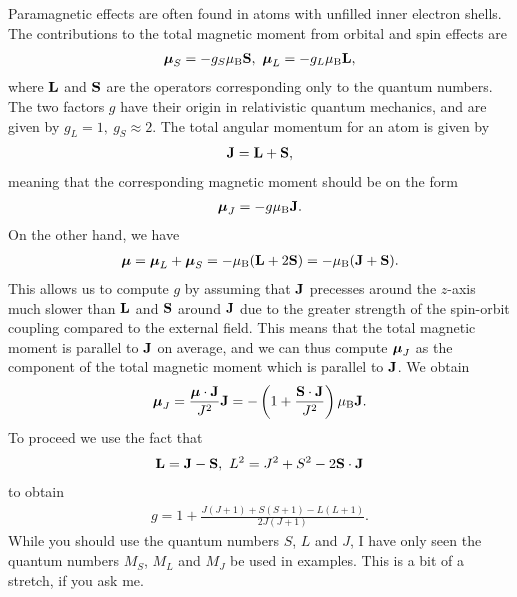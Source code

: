 Paramagnetic effects are often found in atoms with unfilled inner electron shells. The contributions to the total magnetic moment from orbital and spin effects are
\begin{align*}
	\vb*{\mu}_{S} = -g_{S}\mu_{\text{B}}\vb{S},\ \vb*{\mu}_{L} = -g_{L}\mu_{\text{B}}\vb{L},
\end{align*}
where $\vb{L}$ and $\vb{S}$ are the operators corresponding only to the quantum numbers. The two factors $g$ have their origin in relativistic quantum mechanics, and are given by $g_{L} = 1,\ g_{S} \approx 2$. The total angular momentum for an atom is given by
\begin{align*}
	\vb{J} = \vb{L} + \vb{S},
\end{align*}
meaning that the corresponding magnetic moment should be on the form
\begin{align*}
	\vb*{\mu}_{J} = -g\mu_{\text{B}}\vb{J}.
\end{align*}
On the other hand, we have
\begin{align*}
	\vb*{\mu} = \vb*{\mu}_{L} + \vb*{\mu}_{S} = -\mu_{\text{B}}(\vb{L} + 2\vb{S}) = -\mu_{\text{B}}(\vb{J} + \vb{S}).
\end{align*}
This allows us to compute $g$ by assuming that $\vb{J}$ precesses around the $z$-axis much slower than $\vb{L}$ and $\vb{S}$ around $\vb{J}$ due to the greater strength of the spin-orbit coupling compared to the external field. This means that the total magnetic moment is parallel to $\vb{J}$ on average, and we can thus compute $\vb*{\mu}_{J}$ as the component of the total magnetic moment which is parallel to $\vb{J}$. We obtain
\begin{align*}
	\vb*{\mu}_{J} = \frac{\vb*{\mu}\cdot\vb{J}}{J^{2}}\vb{J} = -\left(1 + \frac{\vb{S}\cdot\vb{J}}{J^{2}}\right)\mu_{\text{B}}\vb{J}.
\end{align*}
To proceed we use the fact that
\begin{align*}
	\vb{L} = \vb{J} - \vb{S},\ L^{2} = J^{2} + S^{2} - 2\vb{S}\cdot\vb{J}
\end{align*}
to obtain
\begin{align*}
	g = 1 + \frac{J(J + 1) + S(S + 1) - L(L + 1)}{2J(J + 1)}.
\end{align*}
While you should use the quantum numbers $S$, $L$ and $J$, I have only seen the quantum numbers $M_{S}$, $M_{L}$ and $M_{J}$ be used in examples. This is a bit of a stretch, if you ask me.

